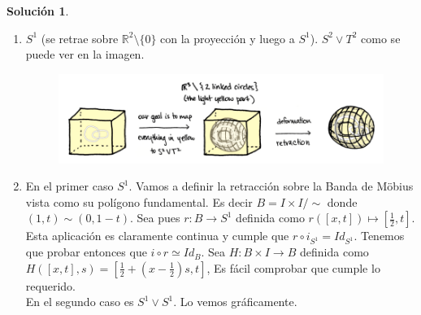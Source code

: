 \documentclass{article}
\theoremstyle{plain}
\theoremstyle{definition}
\newtheorem*{sol*}{Solución}
\newcommand{\R}{\mathbb{R}}
\begin{document}
\begin{sol*}
\begin{enumerate}

\item $S^1$ (se retrae sobre $\R^2\setminus\{0\}$ con la proyección y luego a $S^1$). $S^2\vee T^2$ como se puede ver en la imagen. 
\begin{figure}[h!]
\includegraphics[scale=0.6]{S2wedgeT2}
\end{figure}  

\newpage

\item En el primer caso $S^1$. Vamos a definir la retracción sobre la Banda de Möbius vista como su polígono fundamental. Es decir $B=I\times I/\sim$ donde $(1,t)\sim (0,1-t)$. Sea pues $r:B\to S^1$ definida como $r([x,t])\mapsto [\frac{1}{2},t]$. Esta aplicación es claramente continua y cumple que $r\circ i_{S^1}=Id_{S^1}$. Tenemos que probar entonces que $i\circ r\simeq Id_{B}$. Sea $H:B\times I\to B$ definida como $H([x,t],s)=[\frac{1}{2}+(x-\frac{1}{2})s,t]$, Es fácil comprobar que cumple lo requerido. \\
En el segundo caso es $S^1\vee S^1$. Lo vemos gráficamente. 


\end{enumerate}
\end{sol*}
\end{document}
